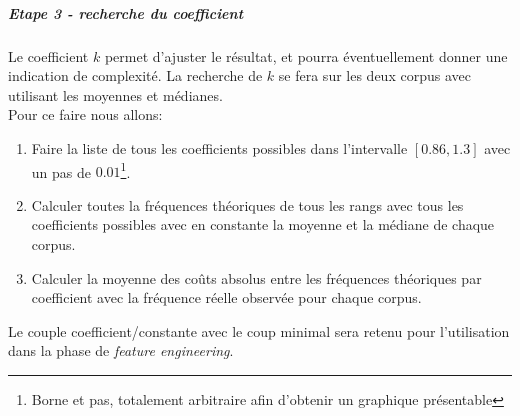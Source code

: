 \documentclass[a4paper,12pt]{article}
\begin{document}
		\subparagraph{Etape 3 - recherche du coefficient}
			Le coefficient $k$ permet d'ajuster le résultat, et pourra éventuellement donner une indication de complexité. La recherche de $k$ se fera sur les deux corpus avec utilisant les moyennes et médianes.\\
			
			Pour ce faire nous allons:

			\begin{enumerate}
				\item Faire la liste de tous les coefficients possibles dans l'intervalle $[0.86, 1.3]$ avec un pas de $0.01$\footnote{Borne et pas, totalement arbitraire afin d'obtenir un graphique présentable}.
				\item Calculer toutes la fréquences théoriques de tous les rangs avec tous les coefficients possibles avec en constante la moyenne et la médiane de chaque corpus.
				\item Calculer la moyenne des coûts absolus entre les fréquences théoriques par coefficient avec la fréquence réelle observée pour chaque corpus.\\
			\end{enumerate}
			
			Le couple coefficient/constante avec le coup minimal sera retenu pour l'utilisation dans la phase de \emph{feature engineering}. \\	
			
\end{document}
